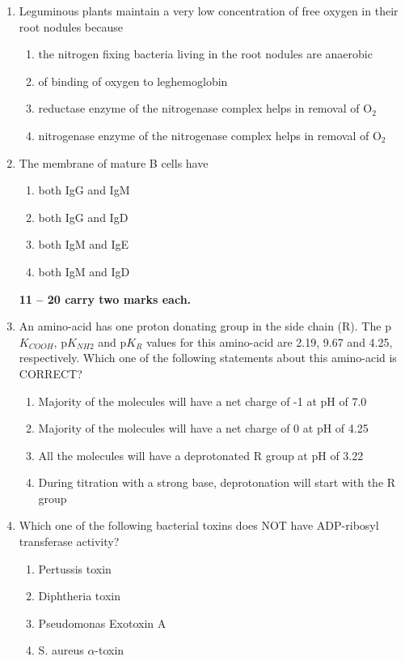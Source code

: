 \documentclass[journal,12pt,onecolumn]{IEEEtran}
\begin{document}
\begin{enumerate}[label=\arabic*.]
\item Leguminous plants maintain a very low concentration of free oxygen in their root nodules because
\begin{enumerate}[label=(\Alph*)]
\item the nitrogen fixing bacteria living in the root nodules are anaerobic
\item of binding of oxygen to leghemoglobin
\item reductase enzyme of the nitrogenase complex helps in removal of O$_2$
\item nitrogenase enzyme of the nitrogenase complex helps in removal of O$_2$
\end{enumerate}

\item The membrane of mature B cells have
\begin{multicols}{2}
\begin{enumerate}[label=(\Alph*)]
\item both IgG and IgM
\item both IgG and IgD
\item both IgM and IgE
\item both IgM and IgD
\end{enumerate}
\end{multicols}

\noindent \textbf{ 11 --  20 carry two marks each.}
\item An amino-acid has one proton donating group in the side chain (R). The p$K_{COOH}$, p$K_{NH2}$ and p$K_R$
values for this amino-acid are 2.19, 9.67 and 4.25, respectively. Which one of the following statements about this amino-acid is CORRECT?
\begin{enumerate}[label=(\Alph*)]
\item Majority of the molecules will have a net charge of -1 at pH of 7.0
\item Majority of the molecules will have a net charge of 0 at pH of 4.25
\item All the molecules will have a deprotonated R group at pH of 3.22
\item During titration with a strong base, deprotonation will start with the R group
\end{enumerate}

\item Which one of the following bacterial toxins does NOT have ADP-ribosyl transferase activity?
\begin{multicols}{2}
\begin{enumerate}[label=(\Alph*)]
\item Pertussis toxin
\item Diphtheria toxin
\item Pseudomonas Exotoxin A
\item S. aureus $\alpha$-toxin
\end{enumerate}
\end{multicols}


\end{enumerate}
\end{document}
